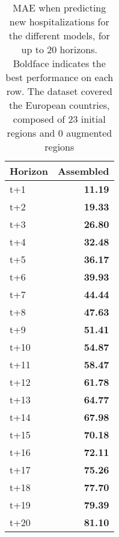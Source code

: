 \begin{table}[H]
\centering
\caption{MAE when predicting new hospitalizations for the different models, for up to 20 horizons. Boldface indicates the best performance on each row. The dataset covered the European countries, composed of 23 initial regions and 0 augmented regions }
\label{tab:MAE_comparison}
\begin{tabular}{lr}
\toprule
Horizon &  Assembled \\
\midrule
t+1  & \textbf{11.19}  \\
t+2  & \textbf{19.33}  \\
t+3  & \textbf{26.80}  \\
t+4  & \textbf{32.48}  \\
t+5  & \textbf{36.17}  \\
t+6  & \textbf{39.93}  \\
t+7  & \textbf{44.44}  \\
t+8  & \textbf{47.63}  \\
t+9  & \textbf{51.41}  \\
t+10  & \textbf{54.87}  \\
t+11  & \textbf{58.47}  \\
t+12  & \textbf{61.78}  \\
t+13  & \textbf{64.77}  \\
t+14  & \textbf{67.98}  \\
t+15  & \textbf{70.18}  \\
t+16  & \textbf{72.11}  \\
t+17  & \textbf{75.26}  \\
t+18  & \textbf{77.70}  \\
t+19  & \textbf{79.39}  \\
t+20  & \textbf{81.10}  \\

\bottomrule
\end{tabular}
\end{table}
